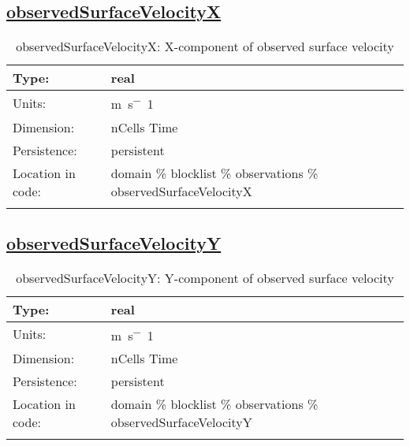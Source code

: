 \subsection[observedSurfaceVelocityX]{\hyperref[sec:var_tab_observations]{observedSurfaceVelocityX}}
\label{subsec:var_sec_observations_observedSurfaceVelocityX}
\begin{center}
\begin{longtable}{| p{2.0in} | p{4.0in} |}
        \hline 
        Type: & real \\
        \hline 
        Units: & \si{m.s^-1} \\
        \hline 
        Dimension: & nCells Time \\
        \hline 
        Persistence: & persistent \\
        \hline 
         Location in code: & domain \% blocklist \% observations \% observedSurfaceVelocityX \\
         \hline 
    \caption{observedSurfaceVelocityX: X-component of observed surface velocity}
\end{longtable}
\end{center}
\subsection[observedSurfaceVelocityY]{\hyperref[sec:var_tab_observations]{observedSurfaceVelocityY}}
\label{subsec:var_sec_observations_observedSurfaceVelocityY}
\begin{center}
\begin{longtable}{| p{2.0in} | p{4.0in} |}
        \hline 
        Type: & real \\
        \hline 
        Units: & \si{m.s^-1} \\
        \hline 
        Dimension: & nCells Time \\
        \hline 
        Persistence: & persistent \\
        \hline 
         Location in code: & domain \% blocklist \% observations \% observedSurfaceVelocityY \\
         \hline 
    \caption{observedSurfaceVelocityY: Y-component of observed surface velocity}
\end{longtable}
\end{center}
